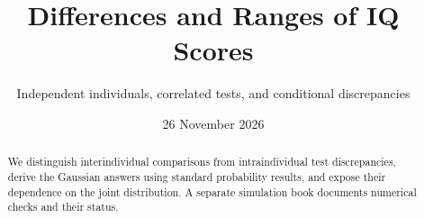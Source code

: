 
\title{Differences and Ranges of IQ Scores}
\subtitle{Independent individuals, correlated tests, and conditional discrepancies}
\author{\ProjectAuthor}
\date{26 November 2026}
\renewcommand{\ProjectReportHighlights}{%
\textbf{Two independent people.} If each person's IQ score is normally
distributed with mean 100 and standard deviation 15, their expected absolute
difference is \textbf{16.93 IQ points}.\par
\textbf{Two tests taken by the same person.} With equal means and SDs of 15
and joint Gaussian correlation 0.6, the expected absolute difference is
\textbf{10.70 points}; the root-mean-square gap is 13.42. Across five such
tests the expected highest-minus-lowest score is \textbf{22.07 points},
not the mean of the ten pairwise gaps.\par
\textbf{Conditioning changes the question.} Given a first score of 145,
the predicted second score is 127, and the expected absolute discrepancy
is 18.70 points. The unconditional average of 10.70 does not apply to this
conditional prediction.\par
\textbf{Interpretation.} Correlation determines the variance of the
difference, but does not determine its mean absolute size or the range.
Models with the same normal margins and correlation matrix can give
different ranges. These are proved consequences of explicit probability
models, not empirical discrepancy norms or measures of an individual's true IQ.}

\frontmatter
\ProjectReportTitlePage
\begin{abstract}
We distinguish interindividual comparisons from intraindividual test
discrepancies, derive the Gaussian answers using standard probability
results, and expose their dependence on the joint distribution.
A separate simulation book documents numerical checks and their status.
\end{abstract}
\tableofcontents
\mainmatter
